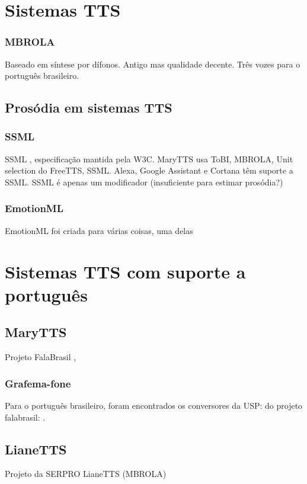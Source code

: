 \section{Sistemas TTS}
\subsubsection{MBROLA}
Baseado em síntese por dífonos. Antigo mas qualidade decente. Três vozes para o
português brasileiro. \cite{mbrola} %

\subsection{Prosódia em sistemas TTS}
\subsubsection{SSML}
SSML \cite{ssml}, especificação mantida pela W3C.
MaryTTS usa ToBI, MBROLA, Unit selection do FreeTTS, SSML.
Alexa, Google Assistant e Cortana têm suporte a SSML.
SSML é apenas um modificador (insuficiente para estimar prosódia?)
\subsubsection{EmotionML}
EmotionML \cite{emotionml} foi criada para várias coisas, uma delas

\section{Sistemas TTS com suporte a português}
\subsection{MaryTTS}
Projeto FalaBrasil \cite{falabrasil}, \cite{couto}
\subsubsection{Grafema-fone}
Para o português brasileiro, foram encontrados os conversores
da USP: \cite{g2pusp} do projeto falabrasil: \cite{falabrasil}.
\subsection{LianeTTS}
Projeto da SERPRO LianeTTS (MBROLA)
